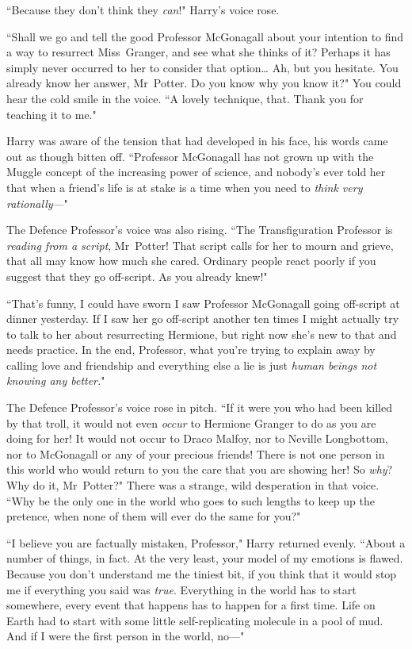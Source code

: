 ``Because they don't think they \emph{can}!" Harry's voice rose.

``Shall we go and tell the good Professor McGonagall about your intention to find a way to resurrect Miss~Granger, and see what she thinks of it? Perhaps it has simply never occurred to her to consider that option{\ldots} Ah, but you hesitate. You already know her answer, Mr~Potter. Do you know why you know it?" You could hear the cold smile in the voice. ``A lovely technique, that. Thank you for teaching it to me."

Harry was aware of the tension that had developed in his face, his words came out as though bitten off. ``Professor McGonagall has not grown up with the Muggle concept of the increasing power of science, and nobody's ever told her that when a friend's life is at stake is a time when you need to \emph{think very rationally}—"

The Defence Professor's voice was also rising. ``The Transfiguration Professor is \emph{reading from a script}, Mr~Potter! That script calls for her to mourn and grieve, that all may know how much she cared. Ordinary people react poorly if you suggest that they go off-script. As you already knew!"

``That's funny, I could have sworn I saw Professor McGonagall going off-script at dinner yesterday. If I saw her go off-script another ten times I might actually try to talk to her about resurrecting Hermione, but right now she's new to that and needs practice. In the end, Professor, what you're trying to explain away by calling love and friendship and everything else a lie is just \emph{human beings not knowing any better.}"

The Defence Professor's voice rose in pitch. ``If it were you who had been killed by that troll, it would not even \emph{occur} to Hermione Granger to do as you are doing for her! It would not occur to Draco Malfoy, nor to Neville Longbottom, nor to McGonagall or any of your precious friends! There is not one person in this world who would return to you the care that you are showing her! So \emph{why}? Why do it, Mr~Potter?" There was a strange, wild desperation in that voice. ``Why be the only one in the world who goes to such lengths to keep up the pretence, when none of them will ever do the same for you?"

``I believe you are factually mistaken, Professor," Harry returned evenly. ``About a number of things, in fact. At the very least, your model of my emotions is flawed. Because you don't understand me the tiniest bit, if you think that it would stop me if everything you said was \emph{true}. Everything in the world has to start somewhere, every event that happens has to happen for a first time. Life on Earth had to start with some little self-replicating molecule in a pool of mud. And if I were the first person in the world, no—"

